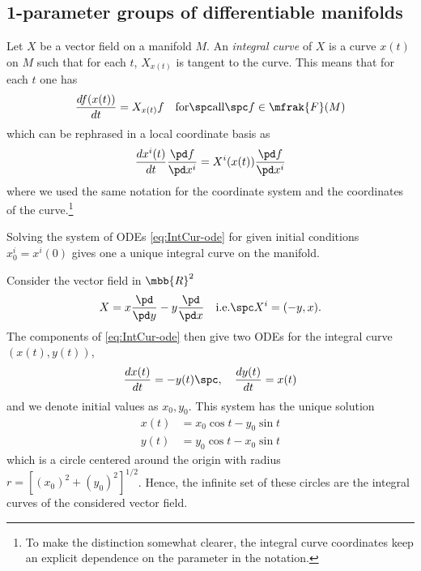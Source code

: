 \documentclass[10pt,reqno]{amsart}
\numberwithin{equation}{section}
\begin{document}
\subsection{1-parameter groups of differentiable manifolds}

Let $X$ be a vector field on a manifold $M$. An \emph{integral 
	curve} of $X$ is a curve $x(t)$ on $M$ such that for each $t$, 
$X_{x(t)}$ is tangent to the curve. This means that for each $t$ 
one has
%
\begin{equation}
	\frac{df(x(t))}{dt} = X_{x(t)}f \quad \mathrm{for\spc all}\spc 
	f \in \mfrak{F}(M)
\end{equation}
%
which can be rephrased in a local coordinate basis as
%
\begin{equation}\label{eq:IntCur-ode}
	\frac{dx^i(t)}{dt} \frac{\pd f}{\pd x^i} = X^i(x(t)) \frac{\pd 
		f}{\pd x^i}
\end{equation}
%
where we used the same notation for the coordinate system and the 
coordinates of the curve.\footnote{To make the distinction 
	somewhat clearer, the integral curve coordinates keep an 
	explicit dependence on the parameter in the notation.}

Solving the system of ODEs \eqref{eq:IntCur-ode} for given 
initial conditions $x_0^i = x^i(0)$ gives one a unique integral 
curve on the manifold.
%
\begin{example}
	Consider the vector field in $\mbb{R}^2$
	\begin{equation}
		X = x\frac{\pd}{\pd y} - y \frac{\pd}{\pd x} 
		\quad\mathrm{i.e.}\spc X^i = (-y,x).
	\end{equation}
	The components of \eqref{eq:IntCur-ode} then give two ODEs for 
	the integral curve $(x(t),y(t))$,
	\begin{displaymath}
		\frac{dx(t)}{dt} = -y(t)\spc,\quad \frac{dy(t)}{dt} = x(t)
	\end{displaymath}
	and we denote initial values as $x_0,y_0$.
	This system has the unique solution
	\begin{equation}
		\begin{split}
			x(t) &= x_0 \cos t - y_0 \sin t \\
			y(t) &= y_0 \cos t - x_0 \sin t
		\end{split}
	\end{equation}
	which is a circle centered around the origin with radius $r = 
	[(x_0)^2 + (y_0)^2 ]^{1/2}$. Hence, the infinite set of these 
	circles are the integral curves of the considered vector field.
\end{example}
%
\end{document}
